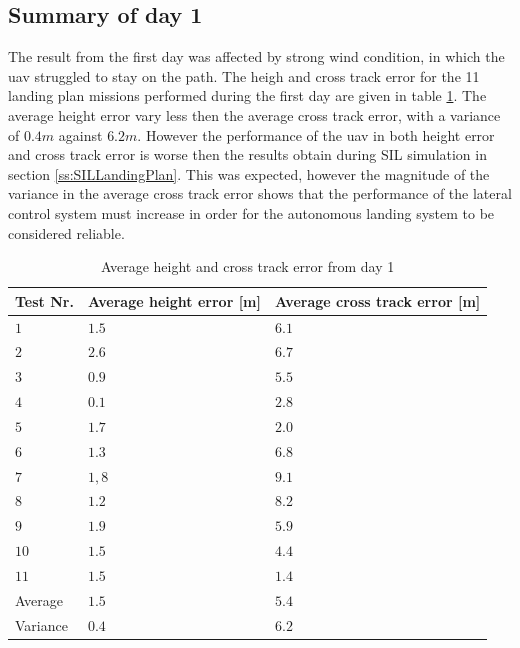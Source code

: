 \subsection{Summary of day 1}\label{sss:summaryDay1}
The result from the first day was affected by strong wind condition, in which the \gls{uav} struggled to stay on the path. The heigh and cross track error for the 11 landing plan missions performed during the first day are given in table \ref{tb:Day1HeightCrossTrack}. The average height error vary less then the average cross track error, with a variance of $0.4 m$ against $6.2 m$. However the performance of the \gls{uav} in both height error and cross track error is worse then the results obtain during SIL simulation in section \ref{ss:SILLandingPlan}. This was expected, however the magnitude of the variance in the average cross track error shows that the performance of the lateral control system must increase in order for the autonomous landing system to be considered reliable.
\begin{table}[H]
\centering
\begin{tabular}{| l | l | l |}
\hline
\textbf{Test Nr.} 	& \textbf{Average height error [m]} 	& \textbf{Average cross track error [m]}  \\ \hline
$1$				& $1.5$							& $6.1$								\\ \hline
$2$				& $2.6$							& $6.7$								\\ \hline
$3$				& $0.9$							& $5.5$								\\ \hline
$4$				& $0.1$							& $2.8$								\\ \hline
$5$				& $1.7$							& $2.0$								\\ \hline
$6$				& $1.3$							& $6.8$								\\ \hline
$7$				& $1,8$							& $9.1$								\\ \hline
$8$				& $1.2$							& $8.2$								\\ \hline
$9$				& $1.9$							& $5.9$								\\ \hline
$10$			& $1.5$							& $4.4$								\\ \hline
$11$			& $1.5$							& $1.4$								\\ \hline
Average			& $1.5$							& $5.4$								\\ \hline
Variance		& $0.4$							& $6.2$								\\ \hline
\end{tabular}
\caption{Average height and cross track error from day 1}
\label{tb:Day1HeightCrossTrack}
\end{table}
